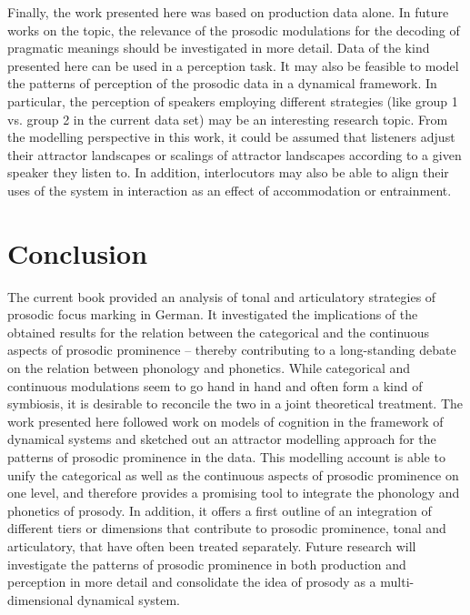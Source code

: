 Finally, the work presented here was based on production data alone. In future works on the topic, the relevance of the prosodic modulations for the decoding of pragmatic meanings should be investigated in more detail. Data of the kind presented here can be used in a perception task. It may also be feasible to model the patterns of perception of the prosodic data in a dynamical framework. In particular, the perception of speakers employing different strategies (like group 1 vs. group 2 in the current data set) may be an interesting research topic. From the modelling perspective in this work, it could be assumed that listeners adjust their attractor landscapes or scalings of attractor landscapes according to a given speaker they listen to. In addition, interlocutors may also be able to align their uses of the system in interaction as an effect of accommodation or entrainment.

\section{Conclusion}

The current book provided an analysis of tonal and articulatory strategies of prosodic focus marking in German. It investigated the implications of the obtained results for the relation between the categorical and the continuous aspects of prosodic prominence -- thereby contributing to a long-standing debate on the relation between phonology and phonetics. While categorical and continuous modulations seem to go hand in hand and often form a kind of symbiosis, it is desirable to reconcile the two in a joint theoretical treatment. The work presented here followed work on models of cognition in the framework of dynamical systems and sketched out an attractor modelling approach for the patterns of prosodic prominence in the data. This modelling account is able to unify the categorical as well as the continuous aspects of prosodic prominence on one level, and therefore provides a promising tool to integrate the phonology and phonetics of prosody. In addition, it offers a first outline of an integration of different tiers or dimensions that contribute to prosodic prominence, tonal and articulatory, that have often been treated separately. Future research will investigate the patterns of prosodic prominence in both production and perception in more detail and consolidate the idea of prosody as a multi-dimensional dynamical system.


